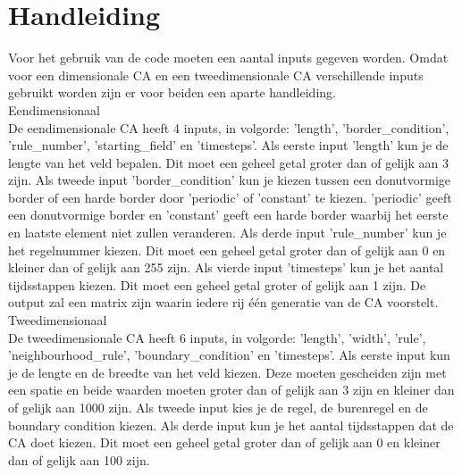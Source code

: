 \documentclass[12pt,a4paper]{article}
\begin{document}
\section*{Handleiding}
Voor het gebruik van de code moeten een aantal inputs gegeven worden. Omdat voor een dimensionale CA en een tweedimensionale CA verschillende inputs gebruikt worden zijn er voor beiden een aparte handleiding. \\
\newline\large{Eendimensionaal} \\
\newline\normalsize De eendimensionale CA heeft 4 inputs, in volgorde: 'length', 'border\_condition', 'rule\_number', 'starting\_field' en 'timesteps'. Als eerste input 'length' kun je de lengte van het veld bepalen. Dit moet een geheel getal groter dan of gelijk aan 3 zijn. Als tweede input 'border\_condition' kun je kiezen tussen een donutvormige border of een harde border door 'periodic' of 'constant' te kiezen. 'periodic' geeft een donutvormige border en 'constant' geeft een harde border waarbij het eerste en laatste element niet zullen veranderen. Als derde input 'rule\_number' kun je het regelnummer kiezen. Dit moet een geheel getal groter dan of gelijk aan 0 en kleiner dan of gelijk aan 255 zijn. Als vierde input 'timesteps' kun je het aantal tijdsstappen kiezen. Dit moet een geheel getal groter of gelijk aan 1 zijn. De output zal een matrix zijn waarin iedere rij één generatie van de CA voorstelt.\\
\newline\large{Tweedimensionaal} \\
\newline\normalsize De tweedimensionale CA heeft 6 inputs, in volgorde: 'length', 'width', 'rule', 'neighbourhood\_rule', 'boundary\_condition' en 'timesteps'. Als eerste input kun je de lengte en de breedte van het veld kiezen. Deze moeten gescheiden zijn met een spatie en beide waarden moeten groter dan of gelijk aan 3 zijn en kleiner dan of gelijk aan 1000 zijn. Als tweede input kies je de regel, de burenregel en de boundary condition kiezen. Als derde input kun je het aantal tijdsstappen dat de CA doet kiezen. Dit moet een geheel getal groter dan of gelijk aan 0 en kleiner dan of gelijk aan 100 zijn.
\newpage
\end{document}
